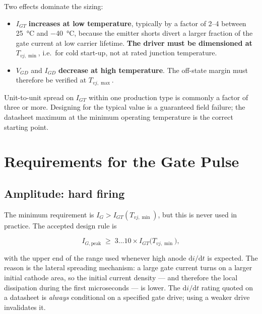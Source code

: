 Two effects dominate the sizing:

\begin{itemize}
  \item $I_{GT}$ \textbf{increases at low temperature}, typically by a factor of
        \numrange{2}{4} between \SI{25}{\celsius} and \SI{-40}{\celsius}, because
        the emitter shorts divert a larger fraction of the gate current at low
        carrier lifetime. \textbf{The driver must be dimensioned at
        $T_{vj,\min}$}, i.e.\ for cold start-up, not at rated junction temperature.
  \item $V_{GD}$ and $I_{GD}$ \textbf{decrease at high temperature}. The off-state
        margin must therefore be verified at $T_{vj,\max}$.
\end{itemize}

Unit-to-unit spread on $I_{GT}$ within one production type is commonly a factor of
three or more. Designing for the typical value is a guaranteed field failure; the
datasheet maximum at the minimum operating temperature is the correct starting
point.

\section{Requirements for the Gate Pulse}

\subsection{Amplitude: hard firing}

The minimum requirement is $I_G > I_{GT}(T_{vj,\min})$, but this is never used in
practice. The accepted design rule is

\begin{equation}
  I_{G,\text{peak}} \;\ge\; 3 \dots 10 \times I_{GT}\big(T_{vj,\min}\big),
  \label{thygate:eq:amp}
\end{equation}

with the upper end of the range used whenever high anode $\mathrm{d}i/\mathrm{d}t$
is expected. The reason is the lateral spreading mechanism: a large gate current
turns on a larger initial cathode area, so the initial current density --- and
therefore the local dissipation during the first microseconds --- is lower. The
$\mathrm{d}i/\mathrm{d}t$ rating quoted on a datasheet is \emph{always} conditional
on a specified gate drive; using a weaker drive invalidates it.

